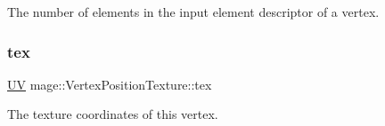 The number of elements in the input element descriptor of a vertex. \hypertarget{structmage_1_1_vertex_position_texture_a9b4efa25d268c812892ecffc2582496e}{}\label{structmage_1_1_vertex_position_texture_a9b4efa25d268c812892ecffc2582496e} 
\subsubsection{\texorpdfstring{tex}{tex}}
{\footnotesize\ttfamily \hyperlink{structmage_1_1_u_v}{UV} mage\+::\+Vertex\+Position\+Texture\+::tex}

The texture coordinates of this vertex. 